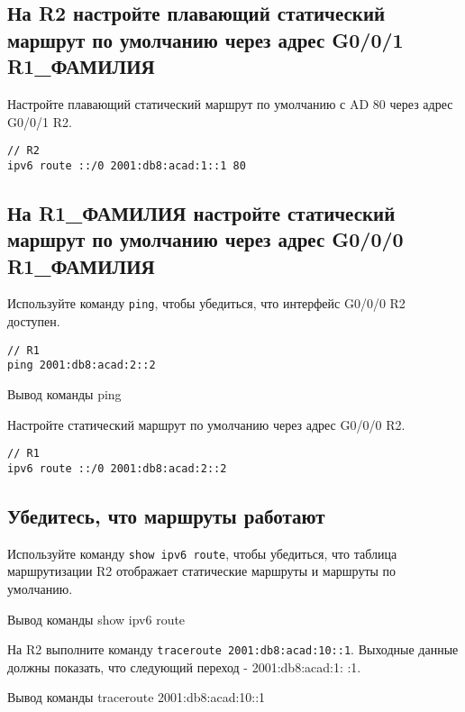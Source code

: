 \subsection{На R2 настройте плавающий статический маршрут
по умолчанию через адрес G0/0/1 R1\_ФАМИЛИЯ}

Настройте плавающий статический маршрут
по умолчанию с AD 80 через адрес G0/0/1 R2.

\begin{verbatim}
// R2
ipv6 route ::/0 2001:db8:acad:1::1 80
\end{verbatim}

\subsection{На R1\_ФАМИЛИЯ настройте статический маршрут
по умолчанию через адрес G0/0/0 R1\_ФАМИЛИЯ}

Используйте команду \texttt{ping}, чтобы убедиться,
что интерфейс G0/0/0 R2 доступен.

\begin{verbatim}
// R1
ping 2001:db8:acad:2::2
\end{verbatim}

\begin{image}
    \caption{Вывод команды ping}
\end{image}

Настройте статический маршрут по умолчанию через адрес G0/0/0 R2.

\begin{verbatim}
// R1
ipv6 route ::/0 2001:db8:acad:2::2
\end{verbatim}

\subsection{Убедитесь, что маршруты работают}

Используйте команду \texttt{show ipv6 route}, чтобы убедиться,
что таблица маршрутизации R2 отображает статические маршруты
и маршруты по умолчанию.

\begin{image}
    \caption{Вывод команды show ipv6 route}
\end{image}

На R2 выполните команду \texttt{traceroute 2001:db8:acad:10::1}.
Выходные данные должны показать, что следующий переход - 2001:db8:acad:1: :1.

\begin{image}
    \caption{Вывод команды traceroute 2001:db8:acad:10::1}
\end{image}

